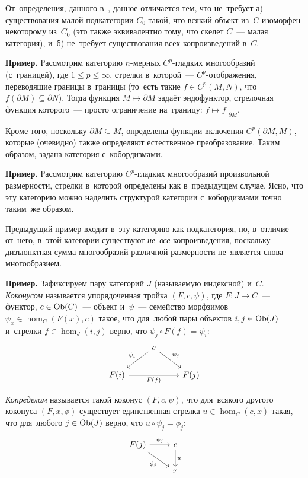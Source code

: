 \documentclass{article}
\begin{document}
От~определения, данного в~\cite{Stong68}, данное отличается тем, что не~требует а) существования малой подкатегории $C_0$
такой, что всякий объект из~$C$ изоморфен некоторому из~$C_0$ (это также эквивалентно тому, что скелет $C$~— малая категория),
и~б) не~требует существования всех копроизведений в~$C$.

\medskip
\noindent\textbf{Пример.} Рассмотрим категорию $n$-мерных $C^p$-гладких многообразий (с~границей), где $1 \leq p \leq \infty$,
стрелки в~которой~— $C^p$-отображения, переводящие границы в~границы (то~есть такие $f \in C^p(M, N)$,
что $f(\partial M) \subseteq \partial N$). Тогда функция $M \mapsto \partial M$ задаёт эндофунктор,
стрелочная функция которого~— просто ограничение на~границу: $f \mapsto f|_{\partial M}$.

Кроме того, поскольку $\partial M \subseteq M$, определены функции-включения $C^p(\partial M, M)$,
которые (очевидно) также определяют естественное преобразование. Таким образом, задана категория с~кобордизмами.
\medskip

\noindent\textbf{Пример.} Рассмотрим категорию $C^p$-гладких многообразий произвольной размерности,
стрелки в~которой определены как в~предыдущем случае. Ясно, что эту категорию можно наделить структурой
категории с~кобордизмами точно таким~же образом.

Предыдущий пример входит в~эту категорию как подкатегория, но, в~отличие от~него, в~этой категории
существуют \textit{не~все} копроизведения, поскольку дизъюнктная сумма многообразий различной размерности
не~является снова многообразием.
\medskip

\noindent\textbf{Пример.} Зафиксируем пару категорий $J$ (называемую индексной) и~$C$. \textit{Коконусом} называется упорядоченная
тройка $(F, c, \psi)$, где $F : J \rightarrow C$~— функтор, $c \in \mathrm{Ob}(C)$~— объект
и~$\psi$~— семейство морфзимов $\psi_x \in \hom_C(F(x), c)$ такое, что для~любой
пары объектов $i, j \in \mathrm{Ob}(J)$ и~стрелки $f \in \hom_J(i, j)$ верно,
что $\psi_j \circ F(f) = \psi_i$:
\[
    \begin{tikzcd}
        &                               & \arrow{ld}{}[swap]{\psi_i} c \arrow{rd}{\psi_j} &      & \\
        & F(i) \arrow{rr}{}[swap]{F(f)} &                                                 & F(j) &
    \end{tikzcd}
\]

\textit{Копределом} называется такой коконус $(F, c, \psi)$, что для~всякого другого коконуса $(F, x, \phi)$
существует единственная стрелка $u \in \hom_C(c, x)$ такая, что для~любого $j \in \mathrm{Ob}(J)$
верно, что $u \circ \psi_j = \phi_j$:
\[
    \begin{tikzcd}
        F(j) \arrow{r}{\psi_j} \arrow{dr}{}[swap]{\phi_j} & \arrow{d}{u} c \\
                                                          & x
    \end{tikzcd}
\]
\end{document}
